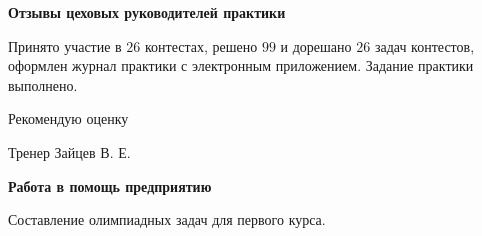 \begin{center}
\bfseries{\large Отзывы цеховых руководителей практики}
\end{center}

Принято участие в $26$ контестах, решено $99$ и дорешано $26$ задач контестов, оформлен журнал практики с электронным приложением. Задание практики выполнено.

Рекомендую оценку

\vspace{15pt}

\hfill Тренер Зайцев В. Е. 

\vspace{200pt}

\begin{center}
\bfseries{\large Работа в помощь предприятию}
\end{center}

Составление олимпиадных задач для первого курса.

\pagebreak
